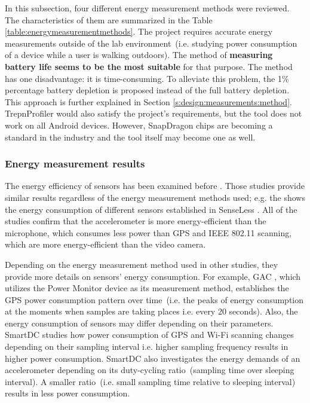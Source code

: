In this subsection, four different energy measurement methods were reviewed. The characteristics of them are summarized in the Table \ref{table:energymeasurementmethods}. The project requires accurate energy measurements outside of the lab environment\ (i.e. studying power consumption of a device while a user is walking outdoors). The method of \textbf{measuring battery life seems to be the most suitable} for that purpose. The method has one disadvantage: it is time-consuming. To alleviate this problem, the 1\% percentage battery depletion is proposed instead of the full battery depletion. This approach is further explained in Section \ref{s:design:measurements:method}. TrepnProfiler would also satisfy the project's requirements, but the tool does not work on all Android devices. However, SnapDragon chips are becoming a standard in the industry and the tool itself may become one as well. 

\subsubsection{Energy measurement results}
\hspace{10pt} The energy efficiency of sensors has been examined before \cite{benabdesslem:senseless} \cite{constandache:localization} \cite{wang:eemss} \cite{chon:smartdc}.  Those studies provide similar results regardless of the energy measurement methods used; e.g. the  shows the energy consumption of different sensors established in SenseLess \cite{benabdesslem:senseless}. All of the studies confirm that the accelerometer is more energy-efficient than the microphone, which consumes less power than GPS and IEEE 802.11 scanning, which are more energy-efficient than the video camera.


Depending on the energy measurement method used in other studies, they provide more details on sensors' energy consumption. For example, GAC \cite{youssef:gac}, which utilizes the Power Monitor device as its measurement method, establishes the GPS power consumption pattern over time\ (i.e. the peaks of energy consumption at the moments when samples are taking places i.e. every 20 seconds). Also, the energy consumption of sensors may differ depending on their parameters. SmartDC \cite{chon:smartdc} studies how power consumption of GPS and Wi-Fi scanning changes depending on their sampling interval i.e. higher sampling frequency results in higher power consumption. SmartDC also investigates the energy demands of an accelerometer depending on its duty-cycling ratio\ (sampling time over sleeping interval). A smaller ratio\ (i.e. small sampling time relative to sleeping interval) results in less power consumption.  

